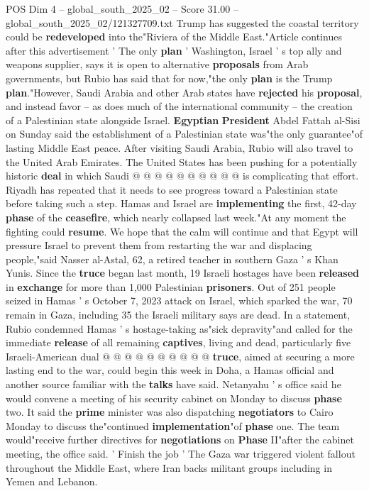 \begin{textsample}{POS Dim 4 – global\_south\_2025\_02 – Score 31.00 – global\_south\_2025\_02/121327709.txt}
Trump has suggested the coastal territory could be \textbf{redeveloped} into the"Riviera of the Middle East."Article continues after this advertisement ' The only \textbf{plan} ' Washington, Israel ' s top ally and weapons supplier, says it is open to alternative \textbf{proposals} from Arab governments, but Rubio has said that for now,"the only \textbf{plan} is the Trump \textbf{plan}."However, Saudi Arabia and other Arab states have \textbf{rejected} his \textbf{proposal}, and instead favor -- as does much of the international community -- the creation of a Palestinian state alongside Israel. \textbf{Egyptian} \textbf{President} Abdel Fattah al-Sisi on Sunday said the establishment of a Palestinian state was"the only guarantee"of lasting Middle East peace.
After visiting Saudi Arabia, Rubio will also travel to the United Arab Emirates.
The United States has been pushing for a potentially historic \textbf{deal} in which Saudi @ @ @ @ @ @ @ @ @ @ is complicating that effort.
Riyadh has repeated that it needs to see progress toward a Palestinian state before taking such a step.
Hamas and Israel are \textbf{implementing} the first, 42-day \textbf{phase} of the \textbf{ceasefire}, which nearly collapsed last week."At any moment the fighting could \textbf{resume}.
We hope that the calm will continue and that Egypt will pressure Israel to prevent them from restarting the war and displacing people,"said Nasser al-Astal, 62, a retired teacher in southern Gaza ' s Khan Yunis.
Since the \textbf{truce} began last month, 19 Israeli hostages have been \textbf{released} in \textbf{exchange} for more than 1,000 Palestinian \textbf{prisoners}.
Out of 251 people seized in Hamas ' s October 7, 2023 attack on Israel, which sparked the war, 70 remain in Gaza, including 35 the Israeli military says are dead.
In a statement, Rubio condemned Hamas ' s hostage-taking as"sick depravity"and called for the immediate \textbf{release} of all remaining \textbf{captives}, living and dead, particularly five Israeli-American dual @ @ @ @ @ @ @ @ @ @ \textbf{truce}, aimed at securing a more lasting end to the war, could begin this week in Doha, a Hamas official and another source familiar with the \textbf{talks} have said.
Netanyahu ' s office said he would convene a meeting of his security cabinet on Monday to discuss \textbf{phase} two.
It said the \textbf{prime} minister was also dispatching \textbf{negotiators} to Cairo Monday to discuss the"continued \textbf{implementation}"of \textbf{phase} one.
The team would"receive further directives for \textbf{negotiations} on \textbf{Phase} II"after the cabinet meeting, the office said. ' Finish the job ' The Gaza war triggered violent fallout throughout the Middle East, where Iran backs militant groups including in Yemen and Lebanon.

\end{textsample}
